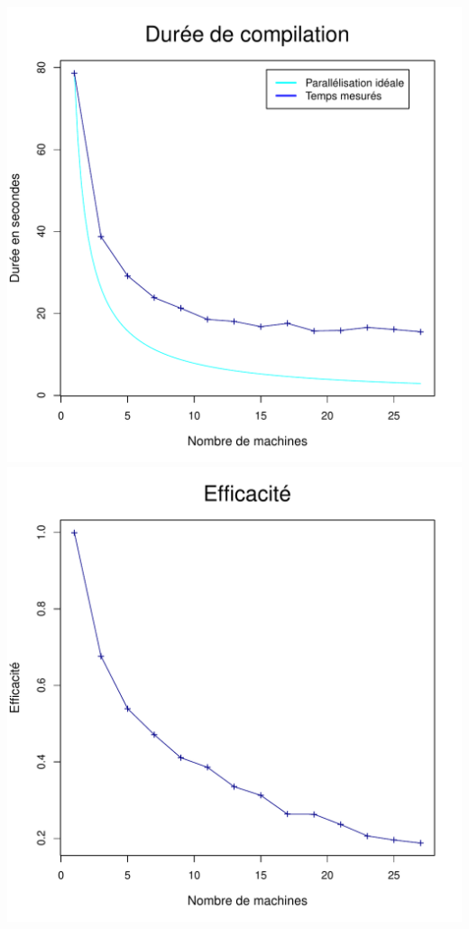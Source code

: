 \documentclass[a4paper, 11pt, titlepage]{article}
\begin{document}
\begin{center}
    \includegraphics[scale=0.45]{res/sujet_makefiles_blender_249_Makefile-recurse_nth1.pdf}
    \includegraphics[scale=0.45]{res/sujet_makefiles_blender_249_Makefile-recurse_nth1_eff.pdf}

\end{center}
\end{document}

